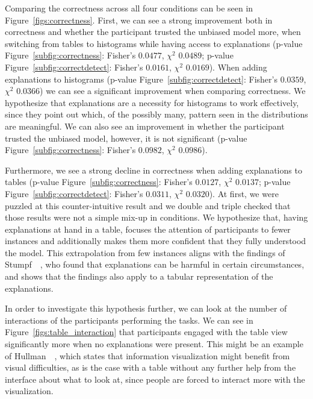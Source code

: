 Comparing the correctness across all four conditions can be seen in Figure~\ref{figs:correctness}.
First, we can see a strong improvement both in correctness and whether the participant trusted the unbiased model more, when switching from tables to histograms while having access to explanations (p-value Figure~\ref{subfig:correctness}: Fisher's $0.0477$, $\chi^2$ $0.0489$; p-value Figure~\ref{subfig:correctdetect}: Fisher's $0.0161$, $\chi^2$ $0.0169$).
When adding explanations to histograms (p-value Figure~\ref{subfig:correctdetect}: Fisher's $0.0359$, $\chi^2$ $0.0366$) we can see a significant improvement when comparing correctness.
We hypothesize that explanations are a necessity for histograms to work effectively, since they point out which, of the possibly many, pattern seen in the distributions are meaningful.
We can also see an improvement in whether the participant trusted the unbiased model, however, it is not significant (p-value Figure~\ref{subfig:correctness}: Fisher's $0.0982$, $\chi^2$ $0.0986$).

Furthermore, we see a strong decline in correctness when adding explanations to tables (p-value Figure~\ref{subfig:correctness}: Fisher's $0.0127$, $\chi^2$ $0.0137$; p-value Figure~\ref{subfig:correctdetect}: Fisher's $0.0311$, $\chi^2$ $0.0320$).
At first, we were puzzled at this counter-intuitive result and we double and triple checked that those results were not a simple mix-up in conditions.
We hypothesize that, having explanations at hand in a table, focuses the attention of participants to fewer instances and additionally makes them more confident that they fully understood the model.
This extrapolation from few instances aligns with the findings of Stumpf~\etal~\cite{harmful}, who found that explanations can be harmful in certain circumstances, and shows that the findings also apply to a tabular representation of the explanations.

In order to investigate this hypothesis further, we can look at the number of interactions of the participants performing the tasks.
We can see in Figure~\ref{figs:table_interaction} that participants engaged with the table view significantly more when no explanations were present.
This might be an example of Hullman~\etal~\cite{6064986}, which states that information visualization might benefit from visual difficulties, as is the case with a table without any further help from the interface about what to look at, since people are forced to interact more with the visualization.

